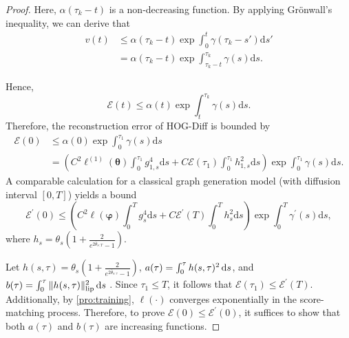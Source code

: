\begin{proof}
Here, $\alpha(\tau_k - t)$ is a non-decreasing function. 
By applying Grönwall’s inequality, we can derive that
\begin{align}
    v(t) & \leq \alpha(\tau_k-t)   \exp{
    \int_0^t \gamma(\tau_k-s') } \mathrm{d}s'  \\
    & = \alpha(\tau_k-t)  \exp{
    \int_{\tau_k-t}^{\tau_k} \gamma(s) } \mathrm{d}s.
\end{align}

Hence,
\begin{equation}
    \mathcal{E}(t) \leq \alpha(t)  \exp{
    \int_t^{\tau_k} \gamma(s) } \mathrm{d}s.
\end{equation}
Therefore, the reconstruction error of HOG-Diff is bounded by 
\begin{equation}
\begin{split}
\mathcal{E}(0)
&\leq \alpha(0)  \exp{ \int_0^{\tau_1} \gamma(s) } \mathrm{d}s \\
&= 
 \left(C^2 \ell^{(1)}(\bm{\theta}) \int_0^{\tau_1} g_{1,s}^4\mathrm{d}s
+ C \mathcal{E}(\tau_1) \int_0^{\tau_1} h_{1,s}^2   \mathrm{d}s \right) \exp{ \int_0^{\tau_1} \gamma(s) } \mathrm{d}s.
\end{split}
\end{equation}
A comparable calculation for a classical graph generation model (with diffusion interval $[0, T]$) yields a bound
\begin{equation}
    \mathcal{E}^\prime (0) \leq
 \left(C^2 \ell(\bm{\varphi}) \int_0^T g_s^4\mathrm{d}s
+ C \mathcal{E}^{\prime}(T) \int_0^T h_s^2   \mathrm{d}s \right) \exp \int_0^T \gamma^\prime(s)  \mathrm{d}s,
\end{equation}
where $h_s=\theta_s \left(1 + \frac{2}{e^{2\bar{\theta}_{s:T}}-1}\right)$.


Let $h(s,\tau)=\theta_s  \left(1 + \frac{2}{e^{2\bar{\theta}_{s:\tau}}-1}\right)$, $a(\tau)=\int_0^{\tau} h(s,\tau)^2 \mathop{}\!\mathrm{d}{s}$, and $b(\tau)=\int_0^{\tau} \|h(s,\tau)\|_{\operatorname{lip}}^2 \mathop{}\!\mathrm{d}{s}$ .
Since $\tau_1\leq T$, it follows that $ \mathcal{E}(\tau_1)\leq \mathcal{E}^\prime(T)$. Additionally, by \cref{pro:training}, $\ell(\cdot)$ converges exponentially in the score-matching process.
Therefore, to prove $\mathcal{E}(0)\leq \mathcal{E}^\prime(0)$, it suffices to show that both $a(\tau)$ and $b(\tau)$ are increasing functions.


\end{proof}
